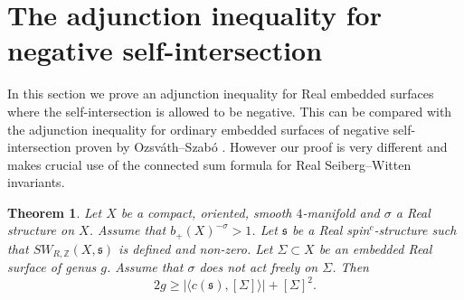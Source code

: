 \documentclass{amsart}
\newtheorem{theorem}{Theorem}[section]
\theoremstyle{definition}
\theoremstyle{remark}
\numberwithin{equation}{section}
\begin{document}
\section{The adjunction inequality for negative self-intersection}\label{sec:adj2}

In this section we prove an adjunction inequality for Real embedded surfaces where the self-intersection is allowed to be negative. This can be compared with the adjunction inequality for ordinary embedded surfaces of negative self-intersection proven by Ozsv\'ath--Szab\'o \cite{os}. However our proof is very different and makes crucial use of the connected sum formula for Real Seiberg--Witten invariants.

\begin{theorem}\label{thm:adjunctionr2}
Let $X$ be a compact, oriented, smooth $4$-manifold and $\sigma$ a Real structure on $X$. Assume that $b_+(X)^{-\sigma} > 1$. Let $\mathfrak{s}$ be a Real spin$^c$-structure such that $SW_{R,\mathbb{Z}}(X , \mathfrak{s})$ is defined and non-zero. Let $\Sigma \subset X$ be an embedded Real surface of genus $g$. Assume that $\sigma$ does not act freely on $\Sigma$. Then
\[
2g \ge | \langle c(\mathfrak{s}) , [\Sigma] \rangle | + [\Sigma]^2.
\]
\end{theorem}
\end{document}
